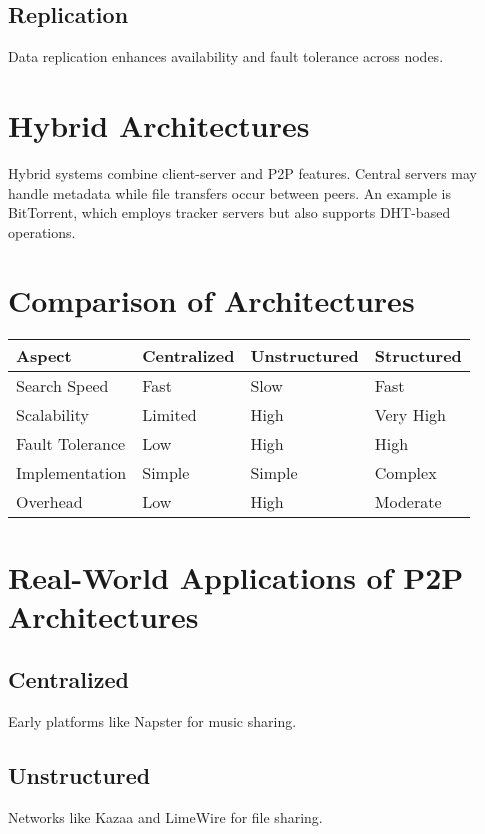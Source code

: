 \documentclass[10pt]{article}
\begin{document}
\subsection{Replication}
Data replication enhances availability and fault tolerance across nodes.

\section{Hybrid Architectures}
Hybrid systems combine client-server and P2P features. Central servers may handle metadata while file transfers occur between peers. An example is BitTorrent, which employs tracker servers but also supports DHT-based operations.

\section{Comparison of Architectures}
\begin{center}
\begin{tabular}{|l|l|l|l|}
\hline
\textbf{Aspect} & \textbf{Centralized} & \textbf{Unstructured} & \textbf{Structured} \\
\hline
Search Speed & Fast & Slow & Fast \\
Scalability & Limited & High & Very High \\
Fault Tolerance & Low & High & High \\
Implementation & Simple & Simple & Complex \\
Overhead & Low & High & Moderate \\
\hline
\end{tabular}
\end{center}

\section{Real-World Applications of P2P Architectures}
\subsection{Centralized}
Early platforms like Napster for music sharing.

\subsection{Unstructured}
Networks like Kazaa and LimeWire for file sharing.
\end{document}
